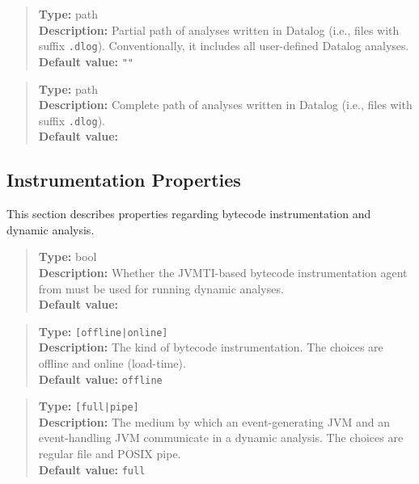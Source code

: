 \begin{quote}
{\bf Type:} path \\
{\bf Description:} Partial path of analyses written in Datalog (i.e., files with suffix {\tt .dlog}).
Conventionally, it includes all user-defined Datalog analyses. \\
{\bf Default value:} {\tt ""}
\end{quote}

\begin{quote}
{\bf Type:} path  \\
{\bf Description:} Complete path of analyses written in Datalog (i.e., files with suffix {\tt .dlog}). \\
{\bf Default value:} 
\end{quote}

\subsection{Instrumentation Properties}
\label{sec:instr-props}

This section describes properties regarding bytecode instrumentation and dynamic analysis.

\begin{quote}
{\bf Type:} bool \\
{\bf Description:} Whether the JVMTI-based bytecode instrumentation agent from  must be used for running dynamic analyses. \\
{\bf Default value:} 
\end{quote}

\begin{quote}
{\bf Type:} {\tt [offline|online]}  \\
{\bf Description:} The kind of bytecode instrumentation.  The choices are offline and online (load-time).  \\
{\bf Default value:} {\tt offline}
\end{quote}

\begin{quote}
{\bf Type:} {\tt [full|pipe]}  \\
{\bf Description:} The medium by which an event-generating JVM and an event-handling JVM communicate in a dynamic analysis.  The choices are regular file and POSIX pipe.  \\
{\bf Default value:} {\tt full} 
\end{quote}

